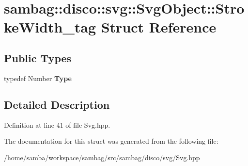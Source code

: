 \hypertarget{structsambag_1_1disco_1_1svg_1_1_svg_object_1_1_stroke_width__tag}{
\section{sambag::disco::svg::SvgObject::StrokeWidth\_\-tag Struct Reference}
\label{structsambag_1_1disco_1_1svg_1_1_svg_object_1_1_stroke_width__tag}
}
\subsection*{Public Types}
\begin{DoxyCompactItemize}
\item 
\hypertarget{structsambag_1_1disco_1_1svg_1_1_svg_object_1_1_stroke_width__tag_ae1b3dd28a1387f8c50c05ae15ba01f3d}{
typedef Number {\bfseries Type}}
\label{structsambag_1_1disco_1_1svg_1_1_svg_object_1_1_stroke_width__tag_ae1b3dd28a1387f8c50c05ae15ba01f3d}

\end{DoxyCompactItemize}


\subsection{Detailed Description}


Definition at line 41 of file Svg.hpp.



The documentation for this struct was generated from the following file:\begin{DoxyCompactItemize}
\item 
/home/samba/workspace/sambag/src/sambag/disco/svg/Svg.hpp\end{DoxyCompactItemize}
